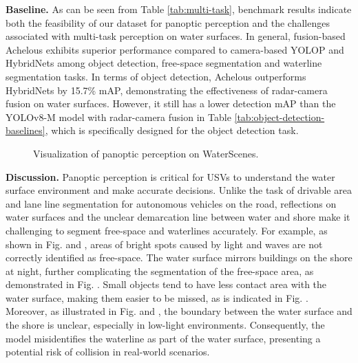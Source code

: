 \documentclass[lettersize,journal]{IEEEtran}
\begin{document}
\textbf{Baseline.} As can be seen from Table \ref{tab:multi-task}, benchmark results indicate both the feasibility of our dataset for panoptic perception and the challenges associated with multi-task perception on water surfaces.
In general, fusion-based Achelous exhibits superior performance compared to camera-based YOLOP and HybridNets among object detection, free-space segmentation and waterline segmentation tasks. In terms of object detection, Achelous outperforms HybridNets by 15.7\% mAP, demonstrating the effectiveness of radar-camera fusion on water surfaces.  
However, it still has a lower detection mAP than the YOLOv8-M model with radar-camera fusion in Table \ref{tab:object-detection-baselines}, which is specifically designed for the object detection task. 

\begin{figure}[h]
\centering
{}
\hspace{-6.6mm}
\quad
{}
\hspace{-6.6mm}
\quad
{}
\vspace{-2mm}

\centering
{}
\hspace{-6.6mm}
\quad
{}
\hspace{-6.6mm}
\quad
{}
\caption{Visualization of panoptic perception on WaterScenes.}
\label{fig:multi-task}
\end{figure}

\textbf{Discussion.} Panoptic perception is critical for USVs to understand the water surface environment and make accurate decisions. Unlike the task of drivable area and lane line segmentation for autonomous vehicles on the road, reflections on water surfaces and the unclear demarcation line between water and shore make it challenging to segment free-space and waterlines accurately.
For example, as shown in Fig.  and , areas of bright spots caused by light and waves are not correctly identified as free-space. 
The water surface mirrors buildings on the shore at night, further complicating the segmentation of the free-space area, as demonstrated in Fig. . 
Small objects tend to have less contact area with the water surface, making them easier to be missed, as is indicated in Fig. . 
Moreover, as illustrated in Fig.  and , the boundary between the water surface and the shore is unclear, especially in low-light environments. Consequently, the model misidentifies the waterline as part of the water surface, presenting a potential risk of collision in real-world scenarios.
\end{document}
